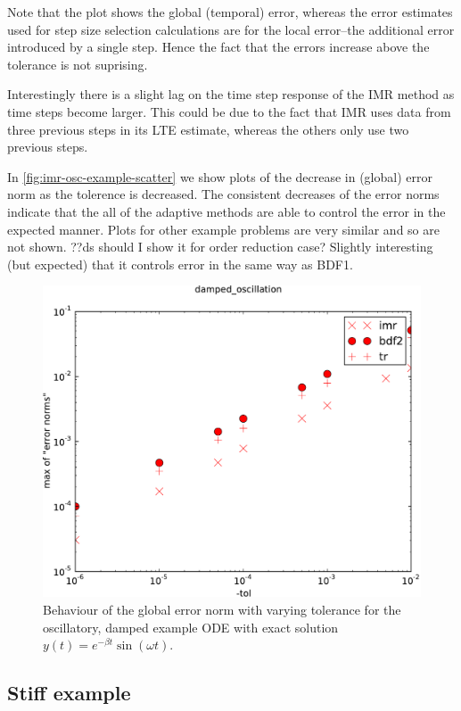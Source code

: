 Note that the plot shows the global (temporal) error, whereas the error estimates used for step size selection calculations are for the local error--the additional error introduced by a single step.
Hence the fact that the errors increase above the tolerance is not suprising.

Interestingly there is a slight lag on the time step response of the IMR method as time steps become larger.
This could be due to the fact that IMR uses data from three previous steps in its LTE estimate, whereas the others only use two previous steps.

In \autoref{fig:imr-osc-example-scatter} we show plots of the decrease in (global) error norm as the tolerence is decreased. 
The consistent decreases of the error norms indicate that the all of the adaptive methods are able to control the error in the expected manner.
Plots for other example problems are very similar and so are not shown.
??ds should I show it for order reduction case? Slightly interesting (but expected) that it controls error in the same way as BDF1.

\begin{figure}[h!]
  \centering \includegraphics[width=1\textwidth]{aimr/damped_oscillation-maxoferrornormsvs-tol}
  \caption{Behaviour of the global error norm with varying tolerance for the oscillatory, damped example ODE with exact solution $y(t) = e^{-\beta t} \sin(\omega t)$.}
  \label{fig:imr-osc-example-scatter}
\end{figure}

\subsection{Stiff example}
\label{sec:imr-stiff-example}

